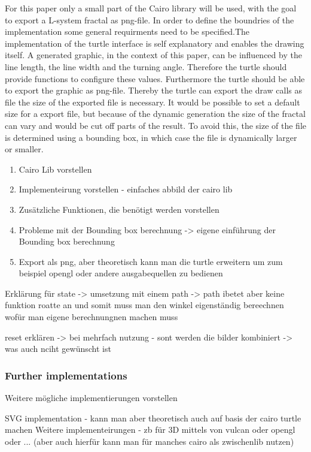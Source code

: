 \documentclass[english]{cpp-hmwk}
\begin{document}
\noindent For this paper only a small part of the Cairo library will be used, with the goal to export a L-system fractal as png-file. In order to define the boundries of the implementation some general requirments need to be specified.The implementation of the turtle interface is self explanatory and enables the drawing itself. A generated graphic, in the context of this paper, can be influenced by the line length, the line width and the turning angle. Therefore the turtle should provide functions to configure these values.
Furthermore the turtle should be able to export the graphic as png-file. Thereby the turtle can export the draw calls as file the size of the exported file is necessary. It would be possible to set a default size for a export file, but because of the dynamic generation the size of the fractal can vary and would be cut off parts of the result. To avoid this, the size of the file is determined using a bounding box, in which case the file is dynamically larger or smaller.\newline

\noindent 


\begin{enumerate}
\item Cairo Lib vorstellen
\item Implementeirung vorstellen - einfaches abbild der cairo lib
\item Zusätzliche Funktionen, die benötigt werden vorstellen
\item Probleme mit der Bounding box berechnung -> eigene einführung der Bounding box berechnung 
\item Export als png, aber theoretisch kann man die turtle erweitern um zum beispiel opengl oder andere ausgabequellen zu bedienen
\end{enumerate} 


Erklärung für state -> umsetzung mit einem path -> path ibetet aber keine funktion roatte an und somit muss man den winkel eigenständig bereechnen wofür man eigene berechnungnen machen muss

reset erklären -> bei mehrfach nutzung - sont werden die bilder kombiniert -> was auch nciht gewünscht ist

\subsubsection{Further implementations}
Weitere mögliche implementierungen vorstellen

SVG implementation - kann man aber theoretisch auch auf basis der cairo turtle machen
Weitere implementeirungen - zb für 3D mittels von vulcan oder opengl oder ... (aber auch hierfür kann man für manches cairo als zwischenlib nutzen)
\end{document}
